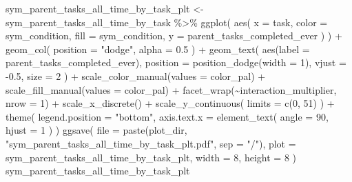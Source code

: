 \documentclass[
]{book}
\newenvironment{Shaded}{\begin{snugshade}}{\end{snugshade}}
\newcommand{\AttributeTok}[1]{\textcolor[rgb]{0.77,0.63,0.00}{#1}}
\newcommand{\DecValTok}[1]{\textcolor[rgb]{0.00,0.00,0.81}{#1}}
\newcommand{\FloatTok}[1]{\textcolor[rgb]{0.00,0.00,0.81}{#1}}
\newcommand{\FunctionTok}[1]{\textcolor[rgb]{0.00,0.00,0.00}{#1}}
\newcommand{\NormalTok}[1]{#1}
\newcommand{\OtherTok}[1]{\textcolor[rgb]{0.56,0.35,0.01}{#1}}
\newcommand{\SpecialCharTok}[1]{\textcolor[rgb]{0.00,0.00,0.00}{#1}}
\newcommand{\StringTok}[1]{\textcolor[rgb]{0.31,0.60,0.02}{#1}}
\begin{document}
\begin{Shaded}
\begin{Highlighting}[]
\NormalTok{sym\_parent\_tasks\_all\_time\_by\_task\_plt }\OtherTok{\textless{}{-}}\NormalTok{ sym\_parent\_tasks\_all\_time\_by\_task }\SpecialCharTok{\%\textgreater{}\%}
  \FunctionTok{ggplot}\NormalTok{(}
    \FunctionTok{aes}\NormalTok{(}
      \AttributeTok{x =}\NormalTok{ task,}
      \AttributeTok{color =}\NormalTok{ sym\_condition,}
      \AttributeTok{fill =}\NormalTok{ sym\_condition,}
      \AttributeTok{y =}\NormalTok{ parent\_tasks\_completed\_ever}
\NormalTok{    )}
\NormalTok{  ) }\SpecialCharTok{+}
  \FunctionTok{geom\_col}\NormalTok{(}
    \AttributeTok{position =} \StringTok{"dodge"}\NormalTok{,}
    \AttributeTok{alpha =} \FloatTok{0.5}
\NormalTok{  ) }\SpecialCharTok{+}
  \FunctionTok{geom\_text}\NormalTok{(}
    \FunctionTok{aes}\NormalTok{(}\AttributeTok{label =}\NormalTok{ parent\_tasks\_completed\_ever),}
    \AttributeTok{position =} \FunctionTok{position\_dodge}\NormalTok{(}\AttributeTok{width =} \DecValTok{1}\NormalTok{),}
    \AttributeTok{vjust =} \SpecialCharTok{{-}}\FloatTok{0.5}\NormalTok{,}
    \AttributeTok{size =} \DecValTok{2}
\NormalTok{  ) }\SpecialCharTok{+}
  \FunctionTok{scale\_color\_manual}\NormalTok{(}\AttributeTok{values =}\NormalTok{ color\_pal) }\SpecialCharTok{+}
  \FunctionTok{scale\_fill\_manual}\NormalTok{(}\AttributeTok{values =}\NormalTok{ color\_pal) }\SpecialCharTok{+}
  \FunctionTok{facet\_wrap}\NormalTok{(}\SpecialCharTok{\textasciitilde{}}\NormalTok{interaction\_multiplier, }\AttributeTok{nrow =} \DecValTok{1}\NormalTok{) }\SpecialCharTok{+}
  \FunctionTok{scale\_x\_discrete}\NormalTok{() }\SpecialCharTok{+}
  \FunctionTok{scale\_y\_continuous}\NormalTok{(}
    \AttributeTok{limits =} \FunctionTok{c}\NormalTok{(}\DecValTok{0}\NormalTok{, }\DecValTok{51}\NormalTok{)}
\NormalTok{  ) }\SpecialCharTok{+}
  \FunctionTok{theme}\NormalTok{(}
    \AttributeTok{legend.position =} \StringTok{"bottom"}\NormalTok{,}
    \AttributeTok{axis.text.x =} \FunctionTok{element\_text}\NormalTok{(}
      \AttributeTok{angle =} \DecValTok{90}\NormalTok{,}
      \AttributeTok{hjust =} \DecValTok{1}
\NormalTok{    )}
\NormalTok{  )}
\FunctionTok{ggsave}\NormalTok{(}
  \AttributeTok{file =} \FunctionTok{paste}\NormalTok{(plot\_dir, }\StringTok{"sym\_parent\_tasks\_all\_time\_by\_task\_plt.pdf"}\NormalTok{, }\AttributeTok{sep =} \StringTok{"/"}\NormalTok{),}
  \AttributeTok{plot =}\NormalTok{ sym\_parent\_tasks\_all\_time\_by\_task\_plt,}
  \AttributeTok{width =} \DecValTok{8}\NormalTok{,}
  \AttributeTok{height =} \DecValTok{8}
\NormalTok{)}
\NormalTok{sym\_parent\_tasks\_all\_time\_by\_task\_plt}
\end{Highlighting}
\end{Shaded}
\end{document}
